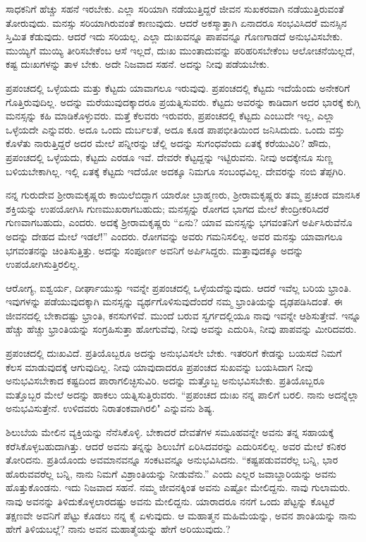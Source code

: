 ಸಾಧಕನಿಗೆ ಹೆಚ್ಚು ಸಹನೆ ಇರಬೇಕು. ಎಲ್ಲಾ ಸರಿಯಾಗಿ ನಡೆಯುತ್ತಿದ್ದರೆ ಜೀವನ ಸುಖಕರವಾಗಿ ನಡೆಯುತ್ತಿರುವಂತೆ ತೋರುವುದು. ಮನಸ್ಸು ಸರಿಯಾಗಿರುವಂತೆ ಕಾಣುವುದು. ಆದರೆ ಅಕಸ್ಮಾತ್ತಾಗಿ ಏನಾದರೂ ಸಂಭವಿಸಿದರೆ ಮನಸ್ಸಿನ ಸ್ತಿಮಿತ ಕೆಡುವುದು. ಆದರೆ ಇದು ಸರಿಯಲ್ಲ. ಎಲ್ಲಾ ದುಃಖವನ್ನೂ ಪಾಪವನ್ನೂ ಗೊಣಗಾಡದೆ ಅನುಭವಿಸಬೇಕು. ಮುಯ್ಯಿಗೆ ಮುಯ್ಯಿ ತೀರಿಸಬೇಕೆಂಬ ಆಸೆ ಇಲ್ಲದೆ, ದುಃಖ ಮುಂತಾದುವನ್ನು ಪರಿಹರಿಸಬೇಕೆಂಬ ಆಲೋಚನೆಯಿಲ್ಲದೆ, ಕಷ್ಟ ದುಃಖಗಳನ್ನು ತಾಳ ಬೇಕು. ಅದೇ ನಿಜವಾದ ಸಹನೆ. ಅದನ್ನು ನೀವು ಪಡೆಯಬೇಕು.

ಪ್ರಪಂಚದಲ್ಲಿ ಒಳ್ಳೆಯದು ಮತ್ತು ಕೆಟ್ಟದು ಯಾವಾಗಲೂ ಇರುವುವು. ಪ್ರಪಂಚದಲ್ಲಿ ಕೆಟ್ಟದು ಇದೆಯೆಂದು ಅನೇಕರಿಗೆ ಗೊತ್ತಿರುವುದಿಲ್ಲ. ಅದನ್ನು ಮರೆಯುವುದಕ್ಕಾದರೂ ಪ್ರಯತ್ನಿಸುವರು. ಕೆಟ್ಟದು ಅವರನ್ನು ಕಾಡಿದಾಗ ಅದರ ಭಾರಕ್ಕೆ ಕುಗ್ಗಿ ಮನಸ್ಸನ್ನು ಕಹಿ ಮಾಡಿಕೊಳ್ಳುವರು. ಮತ್ತೆ ಕೆಲವರು ಇರುವರು, ಪ್ರಪಂಚದಲ್ಲಿ ಕೆಟ್ಟದು ಎಂಬುದೇ ಇಲ್ಲ, ಎಲ್ಲಾ ಒಳ್ಳೆಯದೇ ಎನ್ನುವರು. ಅದೂ ಒಂದು ದುರ್ಬಲತೆ, ಅದೂ ಕೂಡ ಪಾಪಭೀತಿಯಿಂದ ಜನಿಸಿದುದು. ಒಂದು ವಸ್ತು ಕೊಳೆತು ನಾರುತ್ತಿದ್ದರೆ ಅದರ ಮೇಲೆ ಪನ್ನೀರನ್ನು ಚೆಲ್ಲಿ ಅದನ್ನು ಸುಗಂಧವೆಂದು ಏತಕ್ಕೆ ಕರೆಯುವಿರಿ? ಹೌದು, ಪ್ರಪಂಚದಲ್ಲಿ ಒಳ್ಳೆಯದು, ಕೆಟ್ಟದು ಎರಡೂ ಇವೆ. ದೇವರೇ ಕೆಟ್ಟದ್ದನ್ನು ಇಟ್ಟಿರುವನು. ನೀವು ಅದಕ್ಕೇನೂ ಸುಣ್ಣ ಬಳಿಯಬೇಕಾಗಿಲ್ಲ. ಇಲ್ಲಿ ಏತಕ್ಕೆ ಕೆಟ್ಟದು ಇದೆಯೋ ಅದಕ್ಕೂ ನಿಮಗೂ ಸಂಬಂಧವಿಲ್ಲ. ದೇವರನ್ನು ನಂಬಿ ತೆಪ್ಪಗಿರಿ.

ನನ್ನ ಗುರುದೇವ ಶ‍್ರೀರಾಮಕೃಷ್ಣರು ಕಾಯಿಲೆಬಿದ್ದಾಗ ಯಾರೋ ಬ್ರಾಹ್ಮಣರು, ಶ‍್ರೀರಾಮಕೃಷ್ಣರು ತಮ್ಮ ಪ್ರಚಂಡ ಮಾನಸಿಕ ಶಕ್ತಿಯನ್ನು ಉಪಯೋಗಿಸಿ ಗುಣಮುಖರಾಗಬಹುದು; ಮನಸ್ಸನ್ನು ರೋಗದ ಭಾಗದ ಮೇಲೆ ಕೇಂದ್ರೀಕರಿಸಿದರೆ ಗುಣವಾಗಬಹುದು, ಎಂದರು. ಅದಕ್ಕೆ ಶ‍್ರೀರಾಮಕೃಷ್ಣರು “ಏನು? ಯಾವ ಮನಸ್ಸನ್ನು ಭಗವಂತನಿಗೆ ಅರ್ಪಿಸಿರುವೆನೊ ಅದನ್ನು ದೇಹದ ಮೇಲೆ ಇಡಲೆ!'' ಎಂದರು. ರೋಗವನ್ನು ಅವರು ಗಮನಿಸಲಿಲ್ಲ. ಅವರ ಮನಸ್ಸು ಯಾವಾಗಲೂ ಭಗವಂತನನ್ನು ಚಿಂತಿಸುತ್ತಿತ್ತು. ಅದನ್ನು ಸಂಪೂರ್ಣ ಅವನಿಗೆ ಅರ್ಪಿಸಿದ್ದರು. ಮತ್ತಾವುದಕ್ಕೂ ಅದನ್ನು ಉಪಯೋಗಿಸುತ್ತಿರಲಿಲ್ಲ.

ಆರೋಗ್ಯ, ಐಶ್ವರ್ಯ, ದೀರ್ಘಾಯುಸ್ಸು ಇವನ್ನೇ ಪ್ರಪಂಚದಲ್ಲಿ ಒಳ್ಳೆಯದೆನ್ನುವುದು. ಆದರೆ ಇವೆಲ್ಲ ಬರಿಯ ಭ್ರಾಂತಿ. ಇವುಗಳನ್ನು ಪಡೆಯುವುದಕ್ಕಾಗಿ ಮನಸ್ಸನ್ನು ವ್ಯರ್ಥಗೊಳಿಸುವುದೆಂದರೆ ನಮ್ಮ ಭ್ರಾಂತಿಯನ್ನು ದೃಢಪಡಿಸಿದಂತೆ. ಈ ಜೀವನದಲ್ಲಿ ಬೇಕಾದಷ್ಟು ಭ್ರಾಂತಿ, ಕನಸುಗಳಿವೆ. ಮುಂದೆ ಬರುವ ಸ್ವರ್ಗದಲ್ಲಿಯೂ ನಾವು ಇವನ್ನೇ ಆಶಿಸುತ್ತೇವೆ. ಇನ್ನೂ ಹೆಚ್ಚು ಹೆಚ್ಚು ಭ್ರಾಂತಿಯನ್ನು ಸಂಗ್ರಹಿಸುತ್ತಾ ಹೋಗುವೆವು, ನೀವು ಅವನ್ನು ಎದುರಿಸಿ, ನೀವು ಪಾಪವನ್ನು ಮೀರಿದವರು.

ಪ್ರಪಂಚದಲ್ಲಿ ದುಃಖವಿದೆ. ಪ್ರತಿಯೊಬ್ಬರೂ ಅದನ್ನು ಅನುಭವಿಸಲೇ ಬೇಕು. ಇತರರಿಗೆ ಕೇಡನ್ನು ಬಯಸದೆ ನಿಮಗೆ ಕೆಲಸ ಮಾಡುವುದಕ್ಕೆ ಆಗುವುದಿಲ್ಲ. ನೀವು ಯಾವುದಾದರೂ ಪ್ರಪಂಚದ ಸುಖವನ್ನು ಬಯಸಿದಾಗ ನೀವು ಅನುಭವಿಸಬೇಕಾದ ಕಷ್ಟದಿಂದ ಪಾರಾಗಲಿಚ್ಛಿಸುವಿರಿ. ಅದನ್ನು ಮತ್ತೊಬ್ಬ ಅನುಭವಿಸಬೇಕು. ಪ್ರತಿಯೊಬ್ಬರೂ ಮತ್ತೊಬ್ಬರ ಮೇಲೆ ಅದನ್ನು ಹಾಕಲು ಯತ್ನಿಸುತ್ತಿರುವರು. “ಪ್ರಪಂಚದ ದುಃಖ ನನ್ನ ಪಾಲಿಗೆ ಬರಲಿ. ನಾನು ಅದನ್ನೆಲ್ಲಾ ಅನುಭವಿಸುತ್ತೇನೆ. ಉಳಿದವರು ನಿರಾತಂಕವಾಗಿರಲಿ" ಎನ್ನುವನು ಶಿಷ್ಯ.

ಶಿಲುಬೆಯ ಮೇಲಿನ ವ್ಯಕ್ತಿಯನ್ನು ನೆನೆಸಿಕೊಳ್ಳಿ. ಬೇಕಾದರೆ ದೇವತೆಗಳ ಸಮೂಹವನ್ನೇ ಅವನು ತನ್ನ ಸಹಾಯಕ್ಕೆ ಕರೆಸಿಕೊಳ್ಳಬಹುದಾಗಿತ್ತು. ಆದರೆ ಅವನು ತನ್ನನ್ನು ಶಿಲುಬೆಗೆ ಏರಿಸಿದವರನ್ನು ಎದುರಿಸಲಿಲ್ಲ. ಅವರ ಮೇಲೆ ಕನಿಕರ ತೋರಿದನು. ಪ್ರತಿಯೊಂದು ಅವಮಾನವನ್ನೂ ಸಂಕಟವನ್ನೂ ಅನುಭವಿಸಿದನು. “ಕಷ್ಟಪಡುವವರೆಲ್ಲ ಬನ್ನಿ, ಭಾರ ಹೊರುವವರೆಲ್ಲ ಬನ್ನಿ, ನಾನು ನಿಮಗೆ ವಿಶ್ರಾಂತಿಯನ್ನು ನೀಡುವೆನು.” ಎಂದು ಎಲ್ಲರ ಜವಾಬ್ದಾರಿಯನ್ನು ಅವನು ಹೊತ್ತುಕೊಂಡನು. ಇದು ನಿಜವಾದ ಸಹನೆ. ನಮ್ಮ ಜೀವನಕ್ಕಿಂತ ಅವನು ಎಷ್ಟೋ ಮೇಲಿದ್ದನು. ನಾವು ಗುಲಾಮರು. ನಾವು ಅವನನ್ನು ತಿಳಿದುಕೊಳ್ಳಲಾರದಷ್ಟು ಅವನು ಮೇಲಿದ್ದನು. ಯಾರಾದರೂ ನನಗೆ ಒಂದು ಪೆಟ್ಟನ್ನು ಕೊಟ್ಟರೆ ತಕ್ಷಣವೇ ಅವನಿಗೆ ಪೆಟ್ಟು ಕೊಡಲು ನನ್ನ ಕೈ ಏಳುವುದು. ಆ ಮಹಾತ್ಮನ ಮಹಿಮೆಯನ್ನು, ಅವನ ಶಾಂತಿಯನ್ನು ನಾನು ಹೇಗೆ ತಿಳಿಯಬಲ್ಲೆ? ನಾನು ಅವನ ಮಹಾತ್ಮೆಯನ್ನು ಹೇಗೆ ಅರಿಯುವುದು.?

